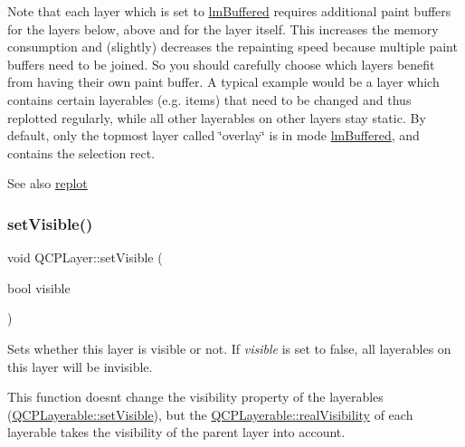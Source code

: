 Note that each layer which is set to \hyperlink{class_q_c_p_layer_a67dcfc1590be2a1f2227c5a39bb59c7cab581b9fab3007c4c65f057f4185d7538}{lm\+Buffered} requires additional paint buffers for the layers below, above and for the layer itself. This increases the memory consumption and (slightly) decreases the repainting speed because multiple paint buffers need to be joined. So you should carefully choose which layers benefit from having their own paint buffer. A typical example would be a layer which contains certain layerables (e.\+g. items) that need to be changed and thus replotted regularly, while all other layerables on other layers stay static. By default, only the topmost layer called \char`\"{}overlay\char`\"{} is in mode \hyperlink{class_q_c_p_layer_a67dcfc1590be2a1f2227c5a39bb59c7cab581b9fab3007c4c65f057f4185d7538}{lm\+Buffered}, and contains the selection rect.

\begin{DoxySeeAlso}{See also}
\hyperlink{class_q_c_p_layer_adefd53b6db02f470151c416f42e37180}{replot} 
\end{DoxySeeAlso}
\mbox{\label{class_q_c_p_layer_ac07671f74edf6884b51a82afb2c19516}} 
\subsubsection{\texorpdfstring{set\+Visible()}{setVisible()}}
{\footnotesize\ttfamily void Q\+C\+P\+Layer\+::set\+Visible (\begin{DoxyParamCaption}\item[{bool}]{visible }\end{DoxyParamCaption})}

Sets whether this layer is visible or not. If {\itshape visible} is set to false, all layerables on this layer will be invisible.

This function doesn\textquotesingle{}t change the visibility property of the layerables (\hyperlink{class_q_c_p_layerable_a3bed99ddc396b48ce3ebfdc0418744f8}{Q\+C\+P\+Layerable\+::set\+Visible}), but the \hyperlink{class_q_c_p_layerable_ab054e88f15d485defcb95e7376f119e7}{Q\+C\+P\+Layerable\+::real\+Visibility} of each layerable takes the visibility of the parent layer into account. \mbox{\label{class_q_c_p_layer_ad1cc2d6b32d2abb33c7f449b964e068c}} 
